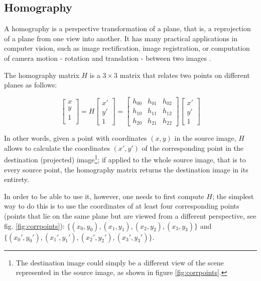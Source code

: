 \documentclass[12pt]{article}
\begin{document}

\subsection{Homography}
\label{chap:homography}

A homography is a perspective transformation of a plane, that is, a reprojection of a plane from one view into another\cite{homography}. It has many practical applications in computer vision, such as image rectification, image registration, or computation of camera motion - rotation and translation - between two images \cite{homographywiki}.

The homography matrix $H$ is a $3\times 3$ matrix that relates two points on different planes as follows\cite{cvhomography}:

\begin{equation}
    \begin{bmatrix}
    x \\
    y \\
    1 \\
    \end{bmatrix}
    = 
    H
    \begin{bmatrix}
    x' \\
    y' \\
    1
    \end{bmatrix}
    =
    \begin{bmatrix}
    h_{00} & h_{01} & h_{02} \\
    h_{10} & h_{11} & h_{12} \\
    h_{20} & h_{21} & h_{22}
    \end{bmatrix}
    \begin{bmatrix}
    x' \\
    y' \\
    1
    \end{bmatrix}
\end{equation}

In other words, given a point with coordinates $(x, y)$ in the source image, $H$ allows to calculate the coordinates $(x', y')$ of the corresponding point in the destination (projected) image\footnote{The destination image could simply be a different view of the scene represented in the source image, as shown in figure \ref{fig:corrpoints}.}; if applied to the whole source image, that is to every source point, the homography matrix returns the destination image in its entirety.

In order to be able to use it, however, one needs to first compute $H$; the simplest way to do this is to use the coordinates of at least four corresponding points (points that lie on the same plane but are viewed from a different perspective, see fig. \ref{fig:corrpoints}): $\{(x_0, y_0), (x_1, y_1), (x_2, y_2), (x_3, y_3)\}$ and $\{(x_0', y_0'), (x_1', y_1'), (x_2', y_2'), (x_3', y_3')\}$.
\end{document}
